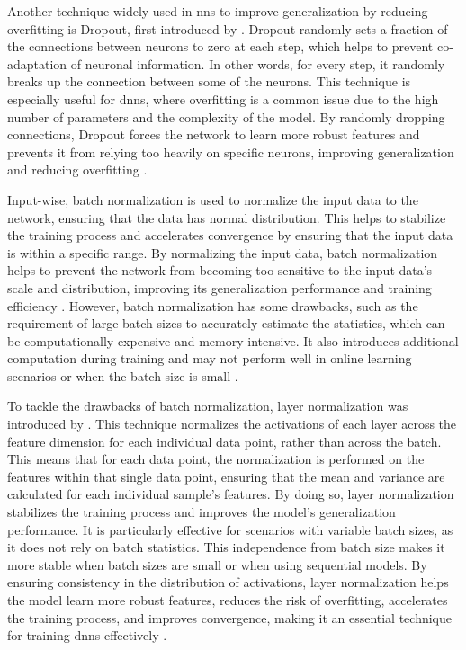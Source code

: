 Another technique widely used in \glspl{nn} to improve generalization by reducing overfitting is Dropout, first introduced by \textcite{Srivastava.Hinton.ea2014}. Dropout randomly sets a fraction of the connections between neurons to zero at each step, which helps to prevent co-adaptation of neuronal information. In other words, for every step, it randomly breaks up the connection between some of the neurons. This technique is especially useful for \glspl{dnn}, where overfitting is a common issue due to the high number of parameters and the complexity of the model. By randomly dropping connections, Dropout forces the network to learn more robust features and prevents it from relying too heavily on specific neurons, improving generalization and reducing overfitting \autocite{Goodfellow.Bengio.ea2016,Srivastava.Hinton.ea2014,Szeliski2022}.

Input-wise, batch normalization is used to normalize the input data to the network, ensuring that the data has normal distribution. This helps to stabilize the training process and accelerates convergence by ensuring that the input data is within a specific range. By normalizing the input data, batch normalization helps to prevent the network from becoming too sensitive to the input data's scale and distribution, improving its generalization performance and training efficiency \autocite{Bernard2021,Bjorck.Gomes.ea2018,Szeliski2022,Zhang.Lipton.ea2023}. However, batch normalization has some drawbacks, such as the requirement of large batch sizes to accurately estimate the statistics, which can be computationally expensive and memory-intensive. It also introduces additional computation during training and may not perform well in online learning scenarios or when the batch size is small \autocite{Ba.Kiros.ea2016,Szeliski2022}.

To tackle the drawbacks of batch normalization, layer normalization was introduced by \textcite{Ba.Kiros.ea2016}. This technique normalizes the activations of each layer across the feature dimension for each individual data point, rather than across the batch. This means that for each data point, the normalization is performed on the features within that single data point, ensuring that the mean and variance are calculated for each individual sample's features. By doing so, layer normalization stabilizes the training process and improves the model's generalization performance. It is particularly effective for scenarios with variable batch sizes, as it does not rely on batch statistics. This independence from batch size makes it more stable when batch sizes are small or when using sequential models. By ensuring consistency in the distribution of activations, layer normalization helps the model learn more robust features, reduces the risk of overfitting, accelerates the training process, and improves convergence, making it an essential technique for training \glspl{dnn} effectively \autocite{Ba.Kiros.ea2016,Bernard2021,Szeliski2022}.


